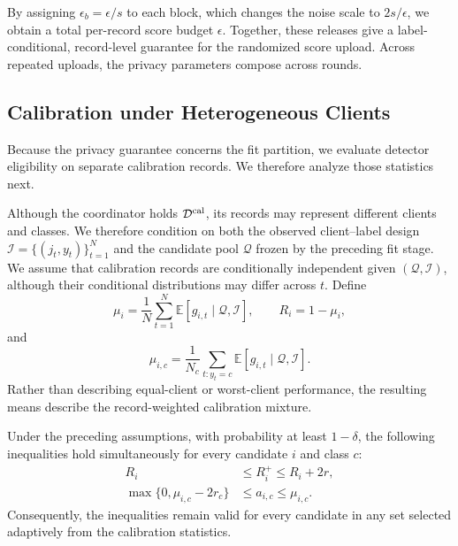 By assigning $\epsilon_b=\epsilon/s$ to each block, which changes the noise
scale to $2s/\epsilon$, we obtain a total per-record score budget $\epsilon$.
Together, these releases give a label-conditional, record-level guarantee for
the randomized score upload. Across repeated uploads, the privacy parameters
compose across rounds.

\subsection{Calibration under Heterogeneous Clients}

Because the privacy guarantee concerns the fit partition, we evaluate detector
eligibility on separate calibration records. We therefore analyze those
statistics next.

Although the coordinator holds $\mathcal D^{\rm cal}$, its records may
represent different clients and classes. We therefore condition on both the
observed client--label design
$\mathcal I=\{(j_t,y_t)\}_{t=1}^{N}$ and the candidate pool $\mathcal Q$
frozen by the preceding fit stage. We assume that calibration records are
conditionally independent given $(\mathcal Q,\mathcal I)$, although their
conditional distributions may differ across $t$. Define
\begin{equation}
\mu_i=\frac1N\sum_{t=1}^{N}\mathbb E[g_{i,t}\mid\mathcal Q,\mathcal I],
\qquad
R_i=1-\mu_i,
\label{eq:heterogeneous_overall_mean}
\end{equation}
and
\begin{equation}
\mu_{i,c}=\frac1{N_c}\sum_{t:y_t=c}
\mathbb E[g_{i,t}\mid\mathcal Q,\mathcal I].
\label{eq:heterogeneous_class_mean}
\end{equation}
Rather than describing equal-client or worst-client performance, the resulting
means describe the record-weighted calibration mixture.

\begin{theorem}
\label{thm:simultaneous_calibration}
Under the preceding assumptions, with probability at least $1-\delta$, the
following inequalities hold simultaneously for every candidate $i$ and
class $c$:
\begin{align}
R_i&\le R_i^+\le R_i+2r,
\label{eq:simultaneous_risk}\\
\max\{0,\mu_{i,c}-2r_c\}
&\le a_{i,c}\le\mu_{i,c}.
\label{eq:simultaneous_class}
\end{align}
Consequently, the inequalities remain valid for every candidate in any set
selected adaptively from the calibration statistics.
\end{theorem}

